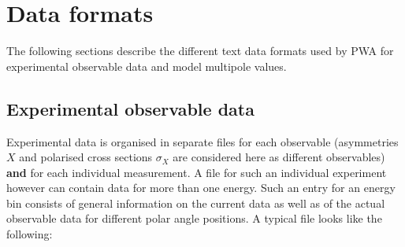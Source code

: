 \documentclass[a4paper,10pt]{article}
\begin{document}
\section{Data formats}

The following sections describe the different text data formats used by PWA for experimental observable data and model multipole values. 

\subsection{Experimental observable data}

Experimental data is organised in separate files for each observable (asymmetries $X$ and polarised cross sections $\sigma_X$
are considered here as different observables) \textbf{and} for each individual measurement. A file for such an individual experiment
however can contain data for more than one energy.
Such an entry for an energy bin consists of general information on the current data as well as of the actual observable data
for different polar angle positions. A typical file looks like the following:\\
\end{document}
